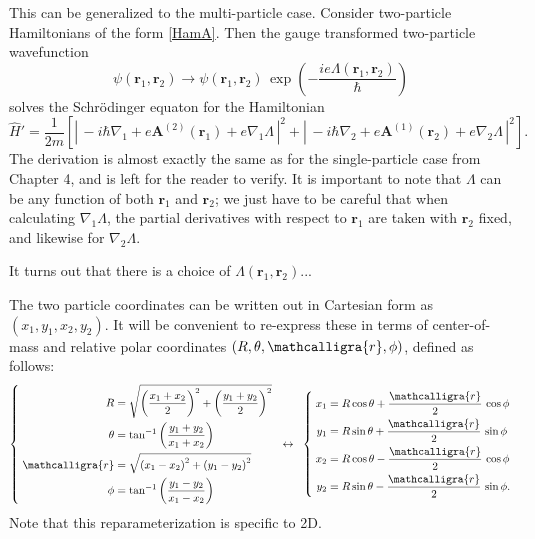 \documentclass[pra,12pt]{revtex4}
\begin{document}
This can be generalized to the multi-particle case.  Consider
two-particle Hamiltonians of the form \eqref{HamA}.  Then the gauge
transformed two-particle wavefunction
\begin{equation}
  \psi(\mathbf{r}_1, \mathbf{r}_2) \rightarrow \psi(\mathbf{r}_1, \mathbf{r}_2)
  \, \exp\left(-\frac{ie\Lambda(\mathbf{r}_1, \mathbf{r}_2)}{\hbar}\right)
\end{equation}
solves the Schr\"odinger equaton for the Hamiltonian
\begin{equation}
  \hat{H}' = \frac{1}{2m} \left[ \left| \, -i\hbar \nabla_1
  + e\mathbf{A}^{(2)}(\mathbf{r}_1) + e \nabla_1 \Lambda\,\right|^2
  + \left| \, -i\hbar \nabla_2
  + e\mathbf{A}^{(1)}(\mathbf{r}_2) + e \nabla_2\Lambda\,\right|^2\right].
\end{equation}
The derivation is almost exactly the same as for the single-particle
case from Chapter 4, and is left for the reader to verify.  It is
important to note that $\Lambda$ can be any function of both
$\mathbf{r}_1$ and $\mathbf{r}_2$; we just have to be careful that
when calculating $\nabla_1\Lambda$, the partial derivatives with
respect to $\mathbf{r}_1$ are taken with $\mathbf{r}_2$ fixed, and
likewise for $\nabla_2\Lambda$.

It turns out that there is a choice of $\Lambda(\mathbf{r}_1,
\mathbf{r}_2)$...




The two particle coordinates can be written out in Cartesian form as
$(x_1, y_1, x_2, y_2)$.  It will be convenient to re-express these in
terms of center-of-mass and relative polar coordinates $(R, \theta,
\mathcalligra{r}, \phi)$, defined as follows:
\begin{align}
  \left\{\;
  \begin{aligned}
  R &= \sqrt{\left(\frac{x_1+x_2}{2}\right)^2 + \left(\frac{y_1+y_2}{2}\right)^2} \\
  \theta &= \tan^{-1}\left(\frac{y_1+y_2}{x_1+x_2}\right) \\
  \mathcalligra{r} &= \sqrt{\left(x_1-x_2\right)^2 + \left(y_1-y_2\right)^2} \\
  \phi &= \tan^{-1}\left(\frac{y_1-y_2}{x_1-x_2}\right)
  \end{aligned}
  \right.
  \;\;\leftrightarrow\;\;
  \left\{ \;
  \begin{aligned}
    x_1 &= R \cos\theta + \frac{\mathcalligra{r}}{2} \,\cos\phi \\
    y_1 &= R \sin\theta + \frac{\mathcalligra{r}}{2} \,\sin\phi \\
    x_2 &= R \cos\theta - \frac{\mathcalligra{r}}{2} \,\cos\phi \\
    y_2 &= R \sin\theta - \frac{\mathcalligra{r}}{2} \,\sin\phi.
  \end{aligned}
  \right.
  \label{reparm}
\end{align}
Note that this reparameterization is specific to 2D.
\end{document}
